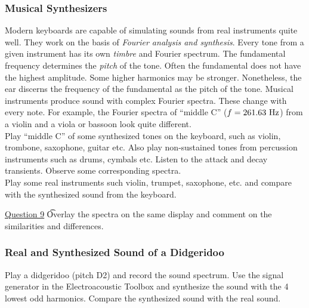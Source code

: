 \documentclass[11pt]{NSF}
\begin{document}
\subsubsection{Musical Synthesizers}

Modern keyboards are capable of simulating sounds from real 
instruments quite well. 
They work on the basis of {\em Fourier analysis and synthesis}. 
Every tone from a given instrument has its own {\em timbre} 
and Fourier spectrum. 
The fundamental frequency determines the {\em pitch} of the tone. 
Often the fundamental does not have the highest amplitude. 
Some higher harmonics may be stronger. 
Nonetheless, the ear discerns the frequency of the fundamental 
as the pitch of the tone. 
Musical instruments produce sound with complex Fourier spectra. 
These change with every note. 
For example, the Fourier spectra of ``middle C” ($f = 261.63~{\rm Hz}$) 
from a violin and a viola or bassoon look quite different. \\

Play “middle C” of some synthesized tones on the keyboard, such as violin, trombone,
saxophone, guitar etc. Also play non-sustained tones from percussion instruments such as drums,
cymbals etc. Listen to the attack and decay transients. Observe some corresponding spectra. \\

Play some real instruments such violin, trumpet, saxophone, etc. and compare with the
synthesized sound from the keyboard. 

\underline{Question 9} \t Overlay the spectra on the same display and comment on the similarities and differences.

\subsubsection{Real and Synthesized Sound of a Didgeridoo}

Play a didgeridoo (pitch D2) and record the sound spectrum. Use the signal generator in the
Electroacoustic Toolbox and synthesize the sound with the 4 lowest odd harmonics. Compare the
synthesized sound with the real sound. \\
\end{document}
